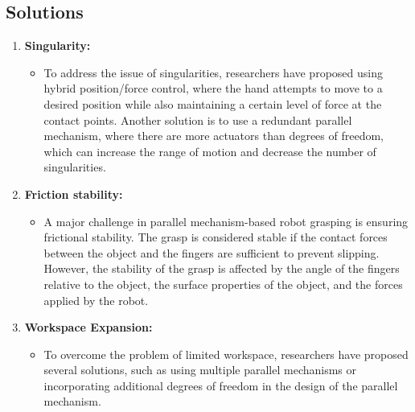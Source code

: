 \documentclass[12pt, twoside]{report}
\begin{document}
\subsection{Solutions}

\begin{enumerate}
    \item \textbf{Singularity: }
    \begin{itemize}
        \item To address the issue of singularities, researchers have proposed using hybrid position/force control, where the hand attempts to move to a desired position while also maintaining a certain level of force at the contact points. Another solution is to use a redundant parallel mechanism, where there are more actuators than degrees of freedom, which can increase the range of motion and decrease the number of singularities.
    \end{itemize}

    \item\textbf{Friction stability:}
    \begin{itemize}
        \item A major challenge in parallel mechanism-based robot grasping is ensuring frictional stability. The grasp is considered stable if the contact forces between the object and the fingers are sufficient to prevent slipping. However, the stability of the grasp is affected by the angle of the fingers relative to the object, the surface properties of the object, and the forces applied by the robot.
    \end{itemize}

    \item \textbf{Workspace Expansion:}
    \begin{itemize}
        \item To overcome the problem of limited workspace, researchers have proposed several solutions, such as using multiple parallel mechanisms or incorporating additional degrees of freedom in the design of the parallel mechanism.
    \end{itemize}


\end{enumerate}
\end{document}
